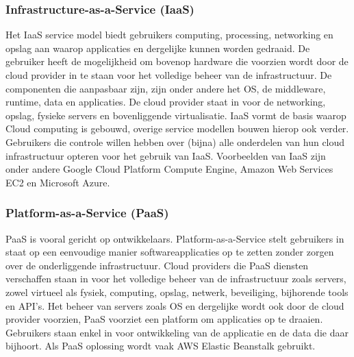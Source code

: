 \subsubsection{Infrastructure-as-a-Service (IaaS)}
Het IaaS service model biedt gebruikers computing, processing, networking en opslag aan waarop applicaties en dergelijke kunnen worden gedraaid. De gebruiker heeft de mogelijkheid om bovenop hardware die voorzien wordt door de cloud provider in te staan voor het volledige beheer van de infrastructuur. De componenten die aanpasbaar zijn, zijn onder andere het OS, de middleware, runtime, data en applicaties. De cloud provider staat in voor de networking, opslag, fysieke servers en bovenliggende virtualisatie. IaaS vormt de basis waarop Cloud computing is gebouwd, overige service modellen bouwen hierop ook verder. Gebruikers die controle willen hebben over (bijna) alle onderdelen van hun cloud infrastructuur opteren voor het gebruik van IaaS. Voorbeelden van IaaS zijn onder andere Google Cloud Platform Compute Engine, Amazon Web Services EC2 en Microsoft Azure.

\subsubsection{Platform-as-a-Service (PaaS)}
PaaS is vooral gericht op ontwikkelaars. Platform-as-a-Service stelt gebruikers in staat op een eenvoudige manier softwareapplicaties op te zetten zonder zorgen over de onderliggende infrastructuur. Cloud providers die PaaS diensten verschaffen staan in voor het volledige beheer van de infrastructuur zoals servers, zowel virtueel als fysiek, computing, opslag, netwerk, beveiliging, bijhorende tools en API's. Het beheer van servers zoals OS en dergelijke wordt ook door de cloud provider voorzien, PaaS voorziet een platform om applicaties op te draaien. Gebruikers staan enkel in voor ontwikkeling van de applicatie en de data die daar bijhoort. Als PaaS oplossing wordt vaak AWS Elastic Beanstalk gebruikt.

